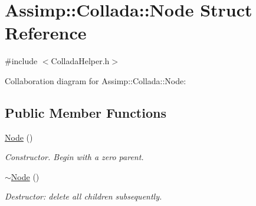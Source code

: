 \hypertarget{struct_assimp_1_1_collada_1_1_node}{\section{Assimp\+:\+:Collada\+:\+:Node Struct Reference}
\label{struct_assimp_1_1_collada_1_1_node}
}


{\ttfamily \#include $<$Collada\+Helper.\+h$>$}



Collaboration diagram for Assimp\+:\+:Collada\+:\+:Node\+:
\subsection*{Public Member Functions}
\begin{DoxyCompactItemize}
\item 
\hypertarget{struct_assimp_1_1_collada_1_1_node_a91ddd2d0fdc9d43e6d7b7859406d265a}{\hyperlink{struct_assimp_1_1_collada_1_1_node_a91ddd2d0fdc9d43e6d7b7859406d265a}{Node} ()}\label{struct_assimp_1_1_collada_1_1_node_a91ddd2d0fdc9d43e6d7b7859406d265a}

\begin{DoxyCompactList}\small\item\em Constructor. Begin with a zero parent. \end{DoxyCompactList}\item 
\hypertarget{struct_assimp_1_1_collada_1_1_node_a016989078e062f49b8a7711d88b9cfca}{\hyperlink{struct_assimp_1_1_collada_1_1_node_a016989078e062f49b8a7711d88b9cfca}{$\sim$\+Node} ()}\label{struct_assimp_1_1_collada_1_1_node_a016989078e062f49b8a7711d88b9cfca}

\begin{DoxyCompactList}\small\item\em Destructor\+: delete all children subsequently. \end{DoxyCompactList}\end{DoxyCompactItemize}
